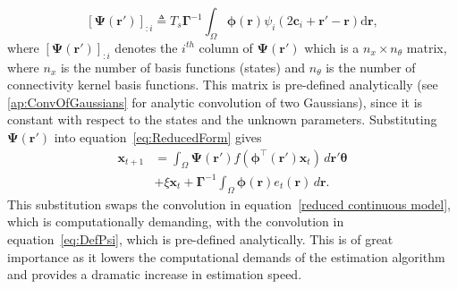 \documentclass[review,authoryear,3p]{elsarticle}
\begin{document}
\begin{equation}\label{eq:DefPsi}
	\left[ \boldsymbol\Psi(\mathbf{r}')\right]_{:i}  \triangleq T_s\boldsymbol{\Gamma}^{-1}\int_\Omega {\boldsymbol{\phi}(\mathbf{r})\psi_i (2\mathbf{c}_i+\mathbf{r}'-\mathbf{r})\textrm{d}\mathbf{r}},
\end{equation}
where $\left[ \boldsymbol\Psi(\mathbf{r}')\right]_{:i}$ denotes the $i^{th}$ column of $\boldsymbol{\Psi}(\mathbf{r}')$ which is a $n_x \times n_{\theta}$ matrix, where $n_x$ is the number of basis functions (states) and $n_{\theta}$ is the number of connectivity kernel basis functions. This matrix is pre-defined analytically (see \ref{ap:ConvOfGaussians} for analytic convolution of two Gaussians), since it is constant with respect to the states and the unknown parameters. Substituting $\boldsymbol{\Psi}(\mathbf{r}')$ into equation~\ref{eq:ReducedForm} gives
\begin{align}
	\mathbf{x}_{t+1} &= \int_\Omega \boldsymbol{\Psi}(\mathbf{r}') f(\boldsymbol{\phi}^{\top}(\mathbf{r}')\mathbf{x}_t) \, d\mathbf{r}' \boldsymbol{\theta} \nonumber \\ &+ \xi\mathbf{x}_t 
+ \boldsymbol{\Gamma}^{-1} \int_\Omega{\boldsymbol{\phi}(\mathbf{r})e_t(\mathbf{r}) \, d\mathbf{r}}.
\end{align}
This substitution swaps the convolution in equation~\ref{reduced continuous model}, which is computationally demanding, with the convolution in equation~\ref{eq:DefPsi}, which is pre-defined analytically. This is of great importance as it lowers the computational demands of the estimation algorithm and provides a dramatic increase in estimation speed. 
\end{document}
